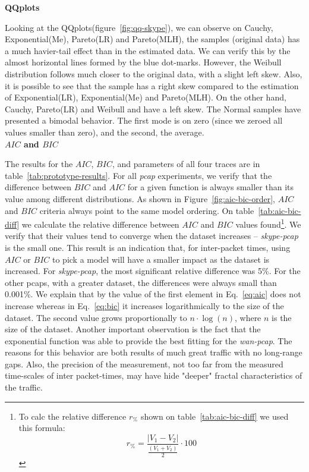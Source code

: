  \noindent  \textbf{QQplots}

Looking at the QQplots(figure~\ref{fig:qq-skype}), we can observe on Cauchy, Exponential(Me), Pareto(LR) and Pareto(MLH), the samples (original data) has a much havier-tail effect than in the estimated data. We can verify this by the almost horizontal lines formed by the blue dot-marks. However, the Weibull distribution follows much closer to the original data, with a slight left skew. Also, it is possible to see that the sample has a right skew compared to the estimation of Exponential(LR), Exponential(Me) and Pareto(MLH). On the other hand, Cauchy, Pareto(LR) and Weibull and have a left skew. The Normal samples have presented a bimodal behavior. The first mode is on zero (since we zeroed all values smaller than zero), and the second, the average.\\


\noindent  \textbf{$AIC$ and $BIC$}

The results for the $AIC$, $BIC$, and parameters of all four traces are in table~\ref{tab:prototype-results}. For all \textit{pcap} experiments, we verify that the difference between $BIC$ and $AIC$ for a given function is always smaller than its value among different distributions. As shown in Figure~\ref{fig:aic-bic-order}, $AIC$ and $BIC$ criteria always point to the same model ordering. On table~\ref{tab:aic-bic-diff} we calculate the relative difference between $AIC$ and $BIC$ values found\footnote{ 
To calc the relative difference $r_\%$ shown on table~\ref{tab:aic-bic-diff} we used this formula:
\begin{equation}
    r_\% = \frac{|V_1-V_2|}{\frac{(V_1+V_2)}{2}}\cdot100 
\end{equation}
}. We verify that their values tend to converge when the dataset increases -- \textit{skype-pcap} is the small one. This result is an indication that, for inter-packet times, using $AIC$ or $BIC$ to pick a model will have a smaller impact as the dataset is increased. For \textit{skype-pcap}, the most significant relative difference was 5\%. For the other pcaps, with a greater dataset, the differences were always small than 0.001\%. We explain that by the value of the first element in Eq.~\ref{eq:aic} does not increase whereas in Eq.~\ref{eq:bic} it increases logarithmically to the size of the dataset. The second value grows proportionally to $n\cdot \log(n)$, where $n$ is the size of the dataset. Another important observation is the fact that the exponential function was able to provide the best fitting for the \textit{wan-pcap}. The reasons for this behavior are both results of much great traffic with no long-range gaps. Also, the precision of the measurement, not too far from the measured time-scales of inter packet-times, may have hide "deeper" fractal characteristics of the traffic.


